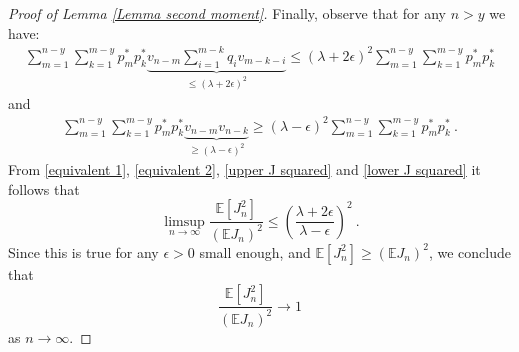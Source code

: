 \documentclass[10pt,a4paper]{amsart}
\newcommand{\E}{\mathbb{E}}
\begin{document}
\begin{proof}[Proof of Lemma \ref{Lemma second moment}]
\noindent Finally, observe that for any $n> y$ we have:
\begin{align}
\sum_{m=1}^{n-y}\sum_{k=1}^{m-y} p_m^*p_k^*\underbrace{v_{n-m}\sum_{i=1}^{m-k} q_i v_{m-k-i}}_{\le (\lambda + 2\epsilon)^2} \le (\lambda +2\epsilon)^2\sum_{m=1}^{n-y}\sum_{k=1}^{m-y} p_m^*p_k^* \label{upper J squared}
\end{align}
and
\begin{align}
    \sum_{m=1}^{n-y}\sum_{k=1}^{m-y} p_m^*p_k^*\underbrace{v_{n-m}v_{n-k}}_{\ge (\lambda - \epsilon)^2} \ge (\lambda - \epsilon)^2\sum_{m=1}^{n-y}\sum_{k=1}^{m-y} p_m^*p_k^*~. \label{lower J squared}
\end{align}
From \eqref{equivalent 1}, \eqref{equivalent 2}, \eqref{upper J squared} and \eqref{lower J squared} it follows that
$$\limsup_{n\to \infty} \frac{\E[J_n^2]}{(\E J_n)^2}\le \left( \frac{\lambda + 2\epsilon}{\lambda - \epsilon}\right)^2 ~.$$
Since this is true for any $\epsilon>0$ small enough, and $\E[J_n^2]\ge (\E J_n)^2$, we conclude that $$\frac{\E [J_n^2]}{(\E J_n)^2}\to 1$$
as $n \to \infty$.\end{proof}
\end{document}
